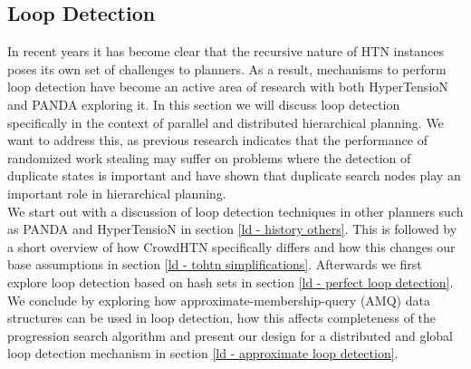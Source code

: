 \subsection{Loop Detection}
\label{improv: loop detection}
In recent years it has become clear that the recursive nature of HTN instances poses its own set of challenges to planners. As a result, mechanisms to perform loop detection have become an active area of research with both HyperTensioN \cite{magnaguagno2020hypertension} and PANDA \cite{holler2021loop} exploring it.
In this section we will discuss loop detection specifically in the context of parallel and distributed hierarchical planning.
We want to address this, as previous research indicates that the performance of randomized work stealing may suffer on problems where the detection of duplicate states is important \cite{fukunaga2018parallel} and \cite{holler2021loop} have shown that duplicate search nodes play an important role in hierarchical planning. \\ 
We start out with a discussion of loop detection techniques in other planners such as PANDA and HyperTensioN in section \ref{ld - history others}. This is followed by a short overview of how CrowdHTN specifically differs and how this changes our base assumptions in section \ref{ld - tohtn simplifications}. Afterwards we first explore loop detection based on hash sets in section \ref{ld - perfect loop detection}. We conclude by exploring how approximate-membership-query (AMQ) data structures can be used in loop detection, how this affects completeness of the progression search algorithm and present our design for a distributed and global loop detection mechanism in section \ref{ld - approximate loop detection}.

\begin{comment}
- loop detection in other planners
- changes in CrowdHTN as a parallel planner
- loop detection based on hash sets
- what happens if we allow false positives
- implications on completeness (and how we deal with it)
- designing a distributed loop detection mechanism with information sharing

\todo{Make sure to always talk about isomorphic task networks instead of equivalent? Quote \cite{holler2021loop}. Define isomorphism!}
\todo{quote about loop detection in graph search?}
\todo{quote about distributed loop detection in graph search?}
This section will discuss loop detection as it is used in (TO)HTN planning in general. It will start with an overview over loop detection in other HTN planners in section \ref{ld - history others}. This is followed by a discussion of the simplifying assumptions we can make for TOHTN planning in section \ref{ld - tohtn simplifications}.
- distributed loop detection (communication and merge operations become important!)
- perfect loop detection
- probabilistic loop detection (approximate membership query)
\end{comment}


